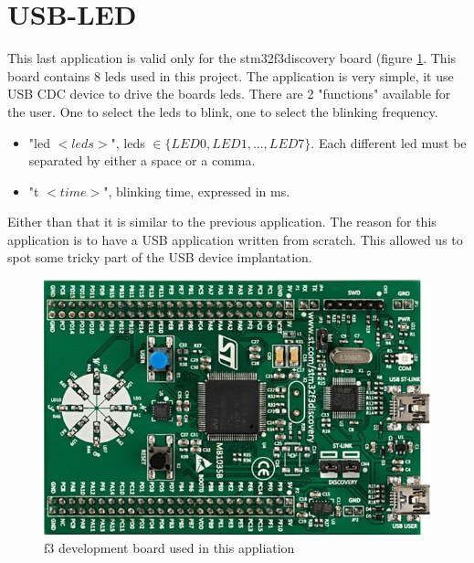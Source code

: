 \documentclass[12pt,a4paper]{report}
\begin{document}
\section{USB-LED}
\label{sec:ul}
This last application is valid only for the stm32f3discovery board (figure \ref{fig:f3board}. This board contains 8 leds used in this project. The application is very simple, it use USB CDC device to drive the boards leds. There are 2 "functions" available for the user. One to select the leds to blink, one to select the blinking frequency.
\begin{itemize}
    \item "led $<leds>$", leds $\in \{LED0, LED1, ..., LED7\} $. Each different led must be separated by either a space or a comma. 
    \item "t $<time>$", blinking time, expressed in ms.
\end{itemize}
Either than that it is similar to the previous application. The reason for this application is to have a USB application written from scratch. This allowed us to spot some tricky part of the USB device implantation.
\begin{figure}
    \centering
    \includegraphics[scale=0.4]{figs/boardf3.jpg}
    \caption{f3 development board used in this appliation}
    \label{fig:f3board}
\end{figure}
\end{document}
